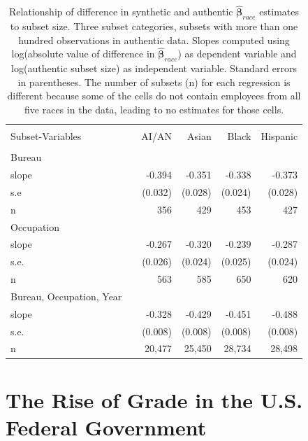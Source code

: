 \documentclass[10pt, letterpaper]{article}
\newcommand{\mest}[1]{\hat{\bm{#1}}}
\begin{document}
\begin{spacing}{1.0}
\begin{table}[h]
    \centering
    \caption{Relationship of difference in synthetic and authentic $\mest{\beta}_{race}$ estimates to subset size.  Three subset categories, subsets with more than one hundred observations in authentic data.  Slopes computed using log(absolute value of difference in $\mest{\beta}_{race}$) as dependent variable and log(authentic subset size) as independent variable.  Standard errors in parentheses. The number of subsets (n) for each regression is different because some of the cells do not contain employees from all five races in the data, leading to no estimates for those cells.}
    \label{table:RaceSubsetDifferenceSlope}
    \begin{tabular}{llrrrr}
        \hline\\[-10pt]
        Subset-Variables & & AI/AN & Asian & Black & Hispanic \\
        \hline\\[-6pt]
        Bureau     & & & & & \\
        slope      & & -0.394  & -0.351  & -0.338  & -0.373  \\
        s.e        & & (0.032) & (0.028) & (0.024) & (0.028) \\
        n          & &   356   &   429   &   453   &   427   \\[10pt]
        Occupation & & & & & \\
        slope      & &  -0.267 &  -0.320 &  -0.239 &  -0.287 \\
        s.e.       & & (0.026) & (0.024) & (0.025) & (0.024) \\
        n          & &   563   &   585   &   650   &   620   \\[10pt]
        Bureau, Occupation, Year & & & & & \\
        slope                    & &  -0.328 &  -0.429 &  -0.451 &  -0.488 \\
        s.e.                     & & (0.008) & (0.008) & (0.008) & (0.008) \\
        n                        & &  20,477 &  25,450 &  28,734 &  28,498 \\[4pt]
        \hline
    \end{tabular}
\end{table}

\clearpage

\section{The Rise of Grade in the U.S. Federal Government}


\end{spacing}
\end{document}

